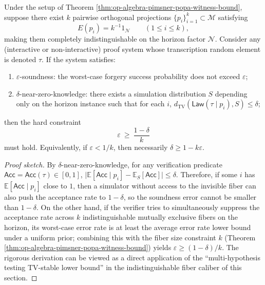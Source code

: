 \begin{corollary}\label{cor:op-algebra-nearzk-soundness-fiber-tradeoff}
Under the setup of Theorem \ref{thm:op-algebra-pimsner-popa-witness-bound}, suppose there exist \(k\) pairwise orthogonal projections \(\{p_i\}_{i=1}^k\subset\mathcal{M}\) satisfying
\[
E(p_i)=k^{-1}1_{\mathcal{N}}\qquad(1\le i\le k),
\]
making them completely indistinguishable on the horizon factor \(\mathcal{N}\).
Consider any (interactive or non-interactive) proof system whose transcription random element is denoted \(\tau\).
If the system satisfies:
\begin{enumerate}
  \item \(\varepsilon\)-soundness: the worst-case forgery success probability does not exceed \(\varepsilon\);
  \item \(\delta\)-near-zero-knowledge: there exists a simulation distribution \(S\) depending only on the horizon instance such that for each \(i\),
  \(d_{\mathrm{TV}}(\mathsf{Law}(\tau\mid p_i),S)\le \delta\);
\end{enumerate}
then the hard constraint
\[
\boxed{\;\varepsilon\ \ge\ \frac{1-\delta}{k}\;}
\]
must hold.
Equivalently, if \(\varepsilon<1/k\), then necessarily \(\delta\ge 1-k\varepsilon\).
\end{corollary}
\begin{proof}[Proof sketch]
By \(\delta\)-near-zero-knowledge, for any verification predicate \(\mathsf{Acc}=\mathsf{Acc}(\tau)\in[0,1]\),
\(
\bigl|\mathbb{E}[\mathsf{Acc}\mid p_i]-\mathbb{E}_S[\mathsf{Acc}]\bigr|\le \delta
\).
Therefore, if some \(i\) has \(\mathbb{E}[\mathsf{Acc}\mid p_i]\) close to \(1\), then a simulator without access to the invisible fiber can also push the acceptance rate to \(1-\delta\), so the soundness error cannot be smaller than \(1-\delta\).
On the other hand, if the verifier tries to simultaneously suppress the acceptance rate across \(k\) indistinguishable mutually exclusive fibers on the horizon, its worst-case error rate is at least the average error rate lower bound under a uniform prior; combining this with the fiber size constraint \(k\) (Theorem \ref{thm:op-algebra-pimsner-popa-witness-bound}) yields \(\varepsilon\ge(1-\delta)/k\).
The rigorous derivation can be viewed as a direct application of the ``multi-hypothesis testing TV-stable lower bound'' in the indistinguishable fiber caliber of this section. \qedhere
\end{proof}

